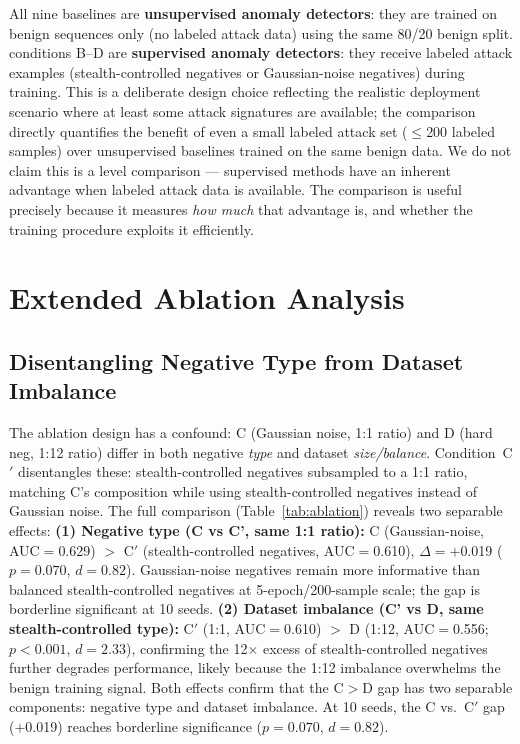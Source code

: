 All nine baselines are \textbf{unsupervised anomaly detectors}: they are trained on
benign sequences only (no labeled attack data) using the same 80/20 benign split.
\ours{} conditions B--D are \textbf{supervised anomaly detectors}: they receive
labeled attack examples (stealth-controlled negatives or Gaussian-noise negatives) during training.
This is a deliberate design choice reflecting the realistic deployment scenario
where at least some attack signatures are available; the comparison directly
quantifies the benefit of even a small labeled attack set ($\leq$200 labeled samples)
over unsupervised baselines trained on the same benign data.
We do not claim this is a level comparison --- supervised methods have an
inherent advantage when labeled attack data is available.
The comparison is useful precisely because it measures \emph{how much} that
advantage is, and whether the \ours{} training procedure exploits it
efficiently.

\section{Extended Ablation Analysis}
\label{app:extended_ablation}

\subsection{Disentangling Negative Type from Dataset Imbalance}
\label{app:cprime}

The ablation design has a confound: C (Gaussian noise, 1:1 ratio) and D (hard neg,
1:12 ratio) differ in both negative \emph{type} and dataset \emph{size/balance}.
Condition~C$'$ disentangles these: stealth-controlled negatives subsampled to a 1:1 ratio,
matching C's composition while using stealth-controlled negatives instead of Gaussian noise.
The full comparison (Table~\ref{tab:ablation}) reveals two separable effects:
\textbf{(1) Negative type (C vs C', same 1:1 ratio):}
C (Gaussian-noise, AUC$=$0.629) $>$ C$'$ (stealth-controlled negatives, AUC$=$0.610),
$\Delta=+$0.019 ($p{=}0.070$, $d{=}0.82$).
Gaussian-noise negatives remain more informative than balanced stealth-controlled negatives
at 5-epoch/200-sample scale; the gap is borderline significant at 10 seeds.
\textbf{(2) Dataset imbalance (C' vs D, same stealth-controlled type):}
C$'$ (1:1, AUC$=$0.610) $>$ D (1:12, AUC$=$0.556; $p{<}0.001$, $d{=}2.33$),
confirming the 12$\times$ excess of stealth-controlled negatives further degrades performance,
likely because the 1:12 imbalance overwhelms the benign training signal.
Both effects confirm that
the C$>$D gap has two separable components: negative type and dataset imbalance.
At 10 seeds, the C vs.\ C$'$ gap ($+$0.019) reaches borderline significance
($p{=}0.070$, $d{=}0.82$).

